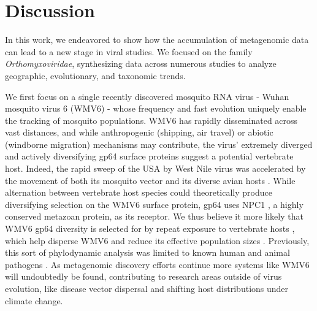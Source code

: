 \documentclass[11pt,twocolumn]{article}
\begin{document}
\section{Discussion}

In this work, we endeavored to show how the accumulation of metagenomic data can lead to a new stage in viral studies. We focused on the family \textit{Orthomyxoviridae}, synthesizing data across numerous studies to analyze geographic, evolutionary, and taxonomic trends.

We first focus on a single recently discovered mosquito RNA virus - Wuhan mosquito virus 6 \citep{li_unprecedented_2015} (WMV6) - whose frequency and fast evolution uniquely enable the tracking of mosquito populations. WMV6 has rapidly disseminated across vast distances, and while anthropogenic (shipping, air travel) \citep{lounibos_invasions_2002,fonseca_pathways_2006,bataille_evidence_2009} or abiotic (windborne migration) \citep{huestis_windborne_2019} mechanisms may contribute, the virus' extremely diverged and actively diversifying gp64 surface proteins suggest a potential vertebrate host. Indeed, the rapid sweep of the USA by West Nile virus was accelerated by the movement of both its mosquito vector and its diverse avian hosts \citep{di_giallonardo_fluid_2015}. While alternation between vertebrate host species could theoretically produce diversifying selection on the WMV6 surface protein, gp64 uses NPC1 \citep{li_baculovirus_2019}, a highly conserved metazoan protein, as its receptor. We thus believe it more likely that WMV6 gp64 diversity is selected for by repeat exposure to vertebrate hosts \citep{jong_antigenic_2007}, which help disperse WMV6 \citep{lycett_brief_2019} and reduce its effective population sizes \citep{bedford_strength_2011}. Previously, this sort of phylodynamic analysis was limited to known human and animal pathogens \citep{drummond_measurably_2003,wheeler_spatial_2010}. As metagenomic discovery efforts continue more systems like WMV6 will undoubtedly be found, contributing to research areas outside of virus evolution, like disease vector dispersal and shifting host distributions under climate change.
\end{document}

